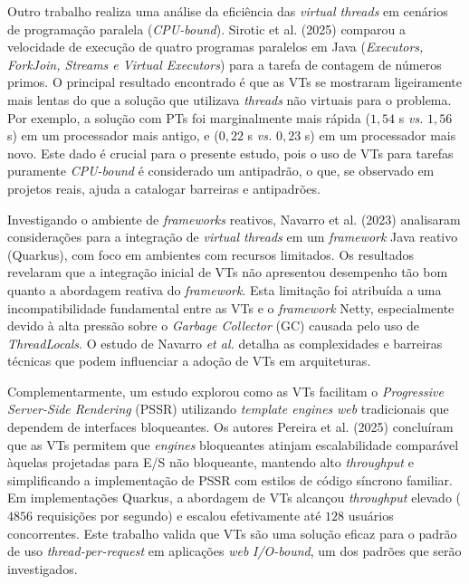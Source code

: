 Outro trabalho realiza uma análise da eficiência das \textit{virtual threads} em cenários de programação paralela (\textit{CPU-bound}). Sirotic et al. (2025) \nocite{sirotic:25} comparou a velocidade de execução de quatro programas paralelos em Java (\textit{Executors, ForkJoin, Streams e Virtual Executors}) para a tarefa de contagem de números primos. O principal resultado encontrado é que as VTs se mostraram ligeiramente mais lentas do que a solução que utilizava \textit{threads} não virtuais para o problema. Por exemplo, a solução com PTs foi marginalmente mais rápida ($1,54$ s \textit{vs.} $1,56$ s) em um processador mais antigo, e ($0,22$ s \textit{vs.} $0,23$ s) em um processador mais novo. Este dado é crucial para o presente estudo, pois o uso de VTs para tarefas puramente \textit{CPU-bound} é considerado um antipadrão, o que, se observado em projetos reais, ajuda a catalogar barreiras e antipadrões. 

Investigando o ambiente de \textit{frameworks} reativos, Navarro et al. (2023)\nocite{navarro:23} analisaram considerações para a integração de \textit{virtual threads} em um \textit{framework} Java reativo (Quarkus), com foco em ambientes com recursos limitados. Os resultados revelaram que a integração inicial de VTs não apresentou desempenho tão bom quanto a abordagem reativa do \textit{framework}. Esta limitação foi atribuída a uma incompatibilidade fundamental entre as VTs e o \textit{framework} Netty, especialmente devido à alta pressão sobre o \textit{Garbage Collector} (GC) causada pelo uso de \textit{ThreadLocals}. O estudo de Navarro \textit{et al.} detalha as complexidades e barreiras técnicas que podem influenciar a adoção de VTs em arquiteturas.

Complementarmente, um estudo explorou como as VTs facilitam o \textit{Progressive Server-Side Rendering} (PSSR) utilizando \textit{template engines} \textit{web} tradicionais que dependem de interfaces bloqueantes. Os autores Pereira et al. (2025)\nocite{pereira:25} concluíram que as VTs permitem que \textit{engines} bloqueantes atinjam escalabilidade comparável àquelas projetadas para E/S não bloqueante, mantendo alto \textit{throughput} e simplificando a implementação de PSSR com estilos de código síncrono familiar. Em implementações Quarkus, a abordagem de VTs alcançou \textit{throughput} elevado ($4856$ requisições por segundo) e escalou efetivamente até $128$ usuários concorrentes. Este trabalho valida que VTs são uma solução eficaz para o padrão de uso \textit{thread-per-request} em aplicações \textit{web} \textit{I/O-bound}, um dos padrões que serão investigados.

